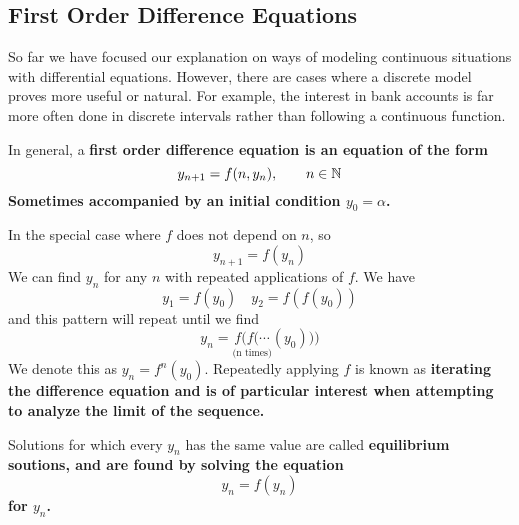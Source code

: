\subsection{First Order Difference Equations}
So far we have focused our explanation on ways of modeling continuous situations with differential equations. However, there are cases where a discrete model proves more useful or natural. For example, the interest in bank accounts is far more often done in discrete intervals rather than following a continuous function. \par
In general, a \bf{first order difference equation} is an equation of the form
\[ y_{n+1} = f(n, y_n), \quad\quad n\in\mathbb{N} \]
Sometimes accompanied by an initial condition $y_0 = \alpha$. \par
In the special case where $f$ does not depend on $n$, so
\[ y_{n+1} = f(y_n) \]
We can find $y_n$ for any $n$ with repeated applications of $f$. We have
\[ y_1 = f(y_0) \quad y_2 = f(f(y_0)) \]
and this pattern will repeat until we find
\[ y_n = \underset{\text{(n times)}}{f(f(\cdots }(y_0))) \]
We denote this as $y_n = f^n(y_0)$. Repeatedly applying $f$ is known as \bf{iterating} the difference equation and is of particular interest when attempting to analyze the limit of the sequence. \par
Solutions for which every $y_n$ has the same value are called \bf{equilibrium soutions}, and are found by solving the equation
\[ y_n = f(y_n) \]
for $y_n$.
